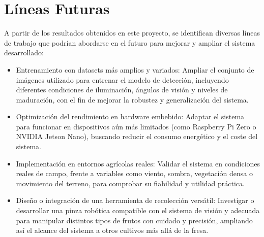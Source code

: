 \section{Líneas Futuras}
\label{sec:lineas_futuras}

A partir de los resultados obtenidos en este proyecto, se identifican diversas líneas de trabajo que podrían abordarse en el futuro para mejorar y ampliar el sistema desarrollado:

\begin{itemize}
    \item Entrenamiento con datasets más amplios y variados: Ampliar el conjunto de imágenes utilizado para entrenar el modelo de detección, incluyendo diferentes condiciones de iluminación, ángulos de visión y niveles de maduración, con el fin de mejorar la robustez y generalización del sistema.
    \item Optimización del rendimiento en hardware embebido: Adaptar el sistema para funcionar en dispositivos aún más limitados (como Raspberry Pi Zero o NVIDIA Jetson Nano), buscando reducir el consumo energético y el coste del sistema.
    \item Implementación en entornos agrícolas reales: Validar el sistema en condiciones reales de campo, frente a variables como viento, sombra, vegetación densa o movimiento del terreno, para comprobar su fiabilidad y utilidad práctica.
    \item Diseño o integración de una herramienta de recolección versátil: Investigar o desarrollar una pinza robótica compatible con el sistema de visión y adecuada para manipular distintos tipos de frutos con cuidado y precisión, ampliando así el alcance del sistema a otros cultivos más allá de la fresa. 
\end{itemize}
